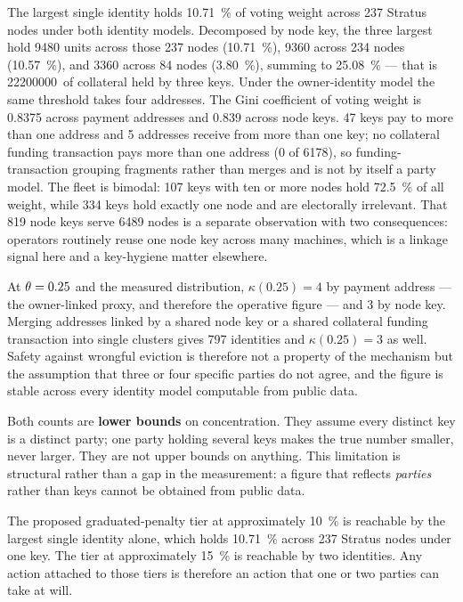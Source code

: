 The largest single identity holds \SI{10.71}{\percent} of voting weight across 237 Stratus nodes
under both identity models. Decomposed by node key, the three largest hold \num{9480} units across
those 237 nodes (\SI{10.71}{\percent}), \num{9360} across 234 nodes (\SI{10.57}{\percent}), and
\num{3360} across 84 nodes (\SI{3.80}{\percent}), summing to \SI{25.08}{\percent} — that is
\num{22200000}\flux\ of collateral held by three keys. Under the owner-identity model the same
threshold takes four addresses. The Gini coefficient of voting weight is \num{0.8375} across payment
addresses and \num{0.839} across node keys. 47 keys pay to more than one address and 5 addresses
receive from more than one key; no collateral funding transaction pays more than one address
(0 of \num{6178}), so funding-transaction grouping fragments rather than merges and is not by itself
a party model. The fleet is bimodal: 107 keys with ten or more nodes hold \SI{72.5}{\percent} of all
weight, while 334 keys hold exactly one node and are electorally irrelevant. That 819 node keys
serve \num{6489} nodes is a separate observation with two consequences: operators routinely reuse
one node key across many machines, which is a linkage signal here and a key-hygiene matter
elsewhere.

\begin{corollary}
\label{cor:23:verdict}
At $\theta = 0.25$ and the measured distribution, $\kappa(0.25) = 4$ by payment address --- the
owner-linked proxy, and therefore the operative figure --- and $3$ by node key. Merging addresses
linked by a shared node key or a shared collateral funding transaction into single clusters gives
797 identities and $\kappa(0.25) = 3$ as well. Safety against wrongful eviction is therefore not a
property of the mechanism but the assumption that three or four specific parties do not agree, and
the figure is stable across every identity model computable from public data.
\end{corollary}

Both counts are \textbf{lower bounds} on concentration. They assume every distinct key is a
distinct party; one party holding several keys makes the true number smaller, never larger. They
are not upper bounds on anything. This limitation is structural rather than a gap in the
measurement: a figure that reflects \emph{parties} rather than keys cannot be obtained from public
data.

\begin{corollary}
\label{cor:23:tiers}
The proposed graduated-penalty tier at approximately \SI{10}{\percent} is reachable by the largest
single identity alone, which holds \SI{10.71}{\percent} across 237 Stratus nodes under one key. The
tier at approximately \SI{15}{\percent} is reachable by two identities. Any action attached to those
tiers is therefore an action that one or two parties can take at will.
\end{corollary}

